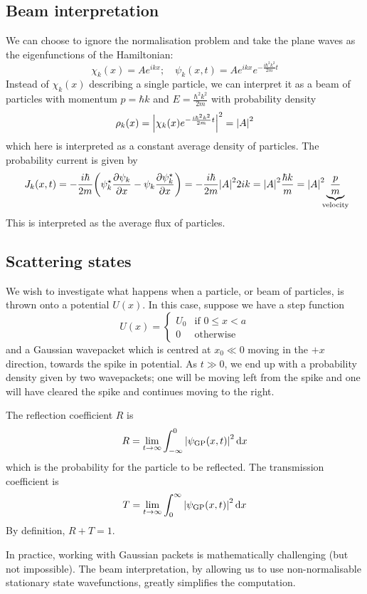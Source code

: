 \subsection{Beam interpretation}
We can choose to ignore the normalisation problem and take the plane waves as the eigenfunctions of the Hamiltonian:
\[ \chi_k(x) = Ae^{ikx};\quad \psi_k(x,t) = Ae^{ikx}e^{-\frac{i \hbar^2 k^2}{2m} t} \]
Instead of \( \chi_k(x) \) describing a single particle, we can interpret it as a beam of particles with momentum \( p = \hbar k \) and \( E = \frac{\hbar^2 k^2}{2m} \) with probability density
\[ \rho_k(x) = \abs{\chi_k(x) e^{-\frac{i\hbar^2 k^2}{2m}t}}^2 = \abs{A}^2 \]
which here is interpreted as a constant average density of particles.
The probability current is given by
\[ J_k(x,t) = - \frac{i\hbar}{2m} \qty(\psi^\star_k \pdv{\psi_k}{x} - \psi_k \pdv{\psi_k^\star}{x}) = -\frac{i\hbar}{2m} \abs{A}^2 2ik = \abs{A}^2 \frac{\hbar k}{m} = \abs{A}^2 \underbrace{\frac{p}{m}}_{\mathclap{\text{velocity}}} \]
This is interpreted as the average flux of particles.

\subsection{Scattering states}
We wish to investigate what happens when a particle, or beam of particles, is thrown onto a potential \( U(x) \).
In this case, suppose we have a step function
\[ U(x) = \begin{cases} U_0 & \text{if } 0 \leq x < a \\
0 & \text{otherwise} \end{cases} \]
and a Gaussian wavepacket which is centred at \( x_0 \ll 0 \) moving in the \( +x \) direction, towards the spike in potential.
As \( t \gg 0 \), we end up with a probability density given by two wavepackets; one will be moving left from the spike and one will have cleared the spike and continues moving to the right.
\begin{definition}
	The reflection coefficient \( R \) is
	\[ R = \lim_{t \to \infty} \int_{-\infty}^0 \abs{\psi_{\text{GP}}(x,t)}^2 \dd{x} \]
	which is the probability for the particle to be reflected.
	The transmission coefficient is
	\[ T = \lim_{t \to \infty} \int_0^\infty \abs{\psi_{\text{GP}}(x,t)}^2 \dd{x} \]
	By definition, \( R + T = 1 \).
\end{definition}
In practice, working with Gaussian packets is mathematically challenging (but not impossible).
The beam interpretation, by allowing us to use non-normalisable stationary state wavefunctions, greatly simplifies the computation.

